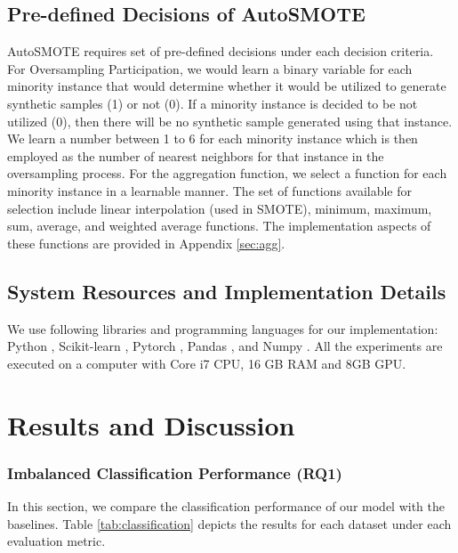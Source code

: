 \subsection{Pre-defined Decisions of AutoSMOTE} \label{sec:predecisions}

AutoSMOTE requires set of pre-defined decisions under each decision criteria. For Oversampling Participation, we would learn a binary variable for each minority instance that would determine whether it would be utilized to generate synthetic samples (1) or not (0). If a minority instance is decided to be not utilized (0), then there will be no synthetic sample generated using that instance.
 We learn a number between 1 to 6 for each minority instance which is then employed as the number of nearest neighbors for that instance in the oversampling process. For the aggregation function, we select a function for each minority instance in a learnable manner. The set of functions available for selection include linear interpolation (used in SMOTE), minimum, maximum, sum, average, and weighted average functions. The implementation aspects of these functions are provided in Appendix \ref{sec:agg}.


\subsection{System Resources and Implementation Details} 

We use following libraries and programming languages for our implementation: Python\cite{van2007python} , Scikit-learn \cite{bisong2019introduction}, Pytorch \cite{imambi2021pytorch}, Pandas \cite{mckinney2015pandas}, and Numpy \cite{bressert2012scipy}. All the experiments are executed on a computer with Core i7 CPU, 16 GB RAM and 8GB GPU.




\section{Results and Discussion}\label{sec:result}
\subsubsection{Imbalanced Classification Performance (RQ1)}

In this section, we compare the classification performance of our model with the baselines. Table \ref{tab:classification} depicts the results for each dataset under each evaluation metric. 

